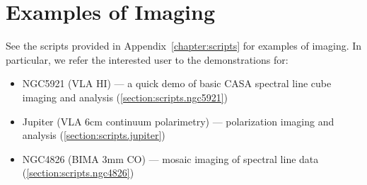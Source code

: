 \section{Examples of Imaging}
\label{section:im.examples}

See the scripts provided in Appendix~\ref{chapter:scripts} for examples of
imaging.  In particular, we refer
the interested user to the demonstrations for:
\begin{itemize}
\item NGC5921 (VLA HI) --- a quick demo of basic CASA spectral line
      cube imaging and analysis
      (\ref{section:scripts.ngc5921})
\item Jupiter (VLA 6cm continuum polarimetry) --- polarization imaging
      and analysis
      (\ref{section:scripts.jupiter})
\item NGC4826 (BIMA 3mm CO) --- mosaic imaging of spectral line data
      (\ref{section:scripts.ngc4826})
\end{itemize}

